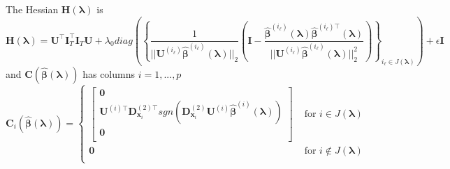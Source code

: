 \documentclass[12pt,letterpaper]{article}
\begin{document}
The Hessian $\boldsymbol{H}(\boldsymbol\lambda)$ is
\begin{equation}
\boldsymbol{H}(\boldsymbol\lambda)
= \boldsymbol{U}^\top \boldsymbol I_T^\top \boldsymbol I_T \boldsymbol{U}
+ \lambda_0 diag  \left ( \left \{
\frac{1}{||\boldsymbol {U}^{(i_\ell)}  \hat{\boldsymbol{\beta}}^{(i_\ell)} (\boldsymbol \lambda)||_2} \left (
\boldsymbol I - \frac{\hat{\boldsymbol{\beta}}^{(i_\ell)} (\boldsymbol \lambda) \hat{\boldsymbol{\beta}}^{(i_\ell)\top} (\boldsymbol \lambda)}{||\boldsymbol {U}^{(i_\ell)}  \hat{\boldsymbol{\beta}}^{(i_\ell)} (\boldsymbol \lambda)||_2^2}
\right )
\right \}_{i_\ell \in J(\boldsymbol{\lambda})}
 \right )
+ \epsilon \boldsymbol I
\label{eq:add_hessian}
\end{equation}
and $\boldsymbol C(\hat{\boldsymbol \beta}( \boldsymbol \lambda))$ has columns $i = 1,...,p$
\begin{equation}
\boldsymbol{C}_i(\hat{\boldsymbol \beta}( \boldsymbol \lambda))
= \begin{cases}
\begin{bmatrix}
\boldsymbol{0} \\
\boldsymbol {U}^{(i)\top}  \boldsymbol{D}^{(2)\top}_{\boldsymbol{x}_i} 
sgn \left ( \boldsymbol{D}^{(2)}_{\boldsymbol{x}_i} \boldsymbol {U}^{(i)} \hat{\boldsymbol{\beta}}^{(i)} ( \boldsymbol \lambda) \right ) \\
\boldsymbol{0} \\
\end{bmatrix}
& \text{ for } i \in J(\boldsymbol \lambda) \\
\boldsymbol{0}
& \text{ for } i \not\in J(\boldsymbol \lambda) \\
\end{cases}
\end{equation}
\end{document}
